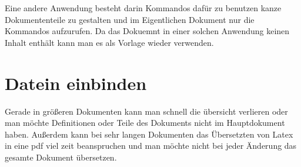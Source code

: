Eine andere Anwendung besteht darin Kommandos dafür zu benutzen kanze Dokumententeile zu gestalten und im
Eigentlichen Dokument nur die Kommandos aufzurufen. Da das Dokuemnt in einer solchen Anwendung keinen Inhalt
enthält kann man es als Vorlage wieder verwenden. 

\section{Datein einbinden}
Gerade in größeren Dokumenten kann man schnell die übersicht verlieren oder man möchte Definitionen oder
Teile des Dokuments nicht im Hauptdokument haben. Außerdem kann bei sehr langen Dokumenten das Übersetzten
von Latex in eine pdf viel zeit beanspruchen und man möchte nicht bei jeder Änderung das gesamte Dokument
übersetzen. 

